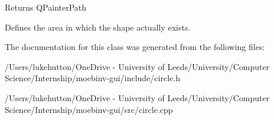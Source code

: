 \begin{DoxyReturn}{Returns}
Q\+Painter\+Path
\end{DoxyReturn}
Defines the area in which the shape actually exists. 

The documentation for this class was generated from the following files\+:\begin{DoxyCompactItemize}
\item 
/\+Users/lukehutton/\+One\+Drive -\/ University of Leeds/\+University/\+Computer Science/\+Internship/moebinv-\/gui/include/circle.\+h\item 
/\+Users/lukehutton/\+One\+Drive -\/ University of Leeds/\+University/\+Computer Science/\+Internship/moebinv-\/gui/src/circle.\+cpp\end{DoxyCompactItemize}
